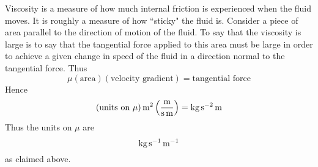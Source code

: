Viscosity is a measure of how much internal friction is experienced when the
fluid moves. It is roughly a measure of how \textquotedblleft sticky" the
fluid is. Consider a piece of area parallel to the direction of motion of
the fluid. To say that the viscosity is large is to say that the tangential
force applied to this area must be large in order to achieve a given change
in speed of the fluid in a direction normal to the tangential force. Thus 
\begin{equation*}
\mu \left( \text{area}\right) \left( \text{velocity gradient}\right) =\text{
tangential force}
\end{equation*}
Hence 
\begin{equation*}
\left( \mbox{units on }\mu \right) \mathop{\textrm{m}}\nolimits^{2}\left( \frac{\mathop{\textrm{m}}\nolimits}{\mathop{\textrm{s}}\nolimits \mathop{\textrm{m}}\nolimits}\right)
=\mathop{\textrm{kg}}\nolimits\mathop{\textrm{s}}\nolimits ^{-2}\mathop{\textrm{m}}\nolimits
\end{equation*}
Thus the units on $\mu $ are 
\begin{equation*}
\mathop{\textrm{kg}}\nolimits\mathop{\textrm{s}}\nolimits ^{-1}\mathop{\textrm{m}}\nolimits^{-1}
\end{equation*}
as claimed above.

